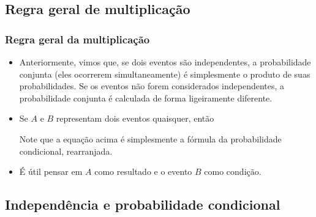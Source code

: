 
\subsection{Regra geral de multiplicação}


\begin{frame}
\frametitle{Regra geral da multiplicação}

\begin{itemize}
\justifying
\item Anteriormente, vimos que, se dois eventos são independentes, a probabilidade conjunta (eles ocorrerem simultaneamente) é simplesmente o produto de suas probabilidades. Se os eventos não forem considerados independentes, a probabilidade conjunta é calculada de forma ligeiramente diferente.

\pause
\justifying
\item Se $A$ e $B$ representam dois eventos quaisquer, então
\formula{\[ P(A~e~B) = P(A|B) \times P(B) \]}
\formula{\[ P(A\cap B) = P(A|B) \times P(B) \]}

\justifying
Note que a equação acima é simplesmente a fórmula da probabilidade condicional, rearranjada.
\pause
\justifying
\item É útil pensar em $A$ como resultado e o evento $B$ como condição.

\end{itemize}

\end{frame}


\subsection{Independência e probabilidade condicional}


